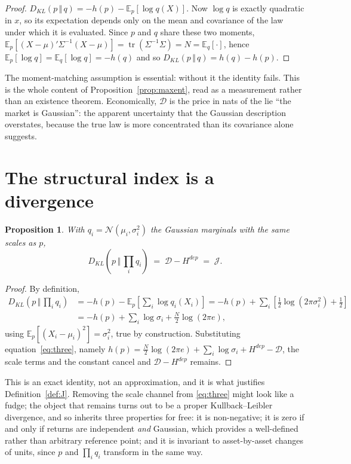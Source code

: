 \documentclass[11pt]{article}
\newtheorem{proposition}{Proposition}
\theoremstyle{definition}
\theoremstyle{remark}
\newcommand{\JJ}{\mathcal{J}}
\newcommand{\DD}{\mathcal{D}}
\newcommand{\KL}[2]{D_{KL}\!\left(#1\,\Vert\,#2\right)}
\begin{document}
\begin{proof}
$\KL{p}{q}=-h(p)-\mathbb{E}_p[\log q(X)]$. Now $\log q$ is exactly quadratic in
$x$, so its expectation depends only on the mean and covariance of the law under
which it is evaluated. Since $p$ and $q$ share these two moments,
$\mathbb{E}_p\!\left[(X-\mu)'\Sigma^{-1}(X-\mu)\right]=\operatorname{tr}(\Sigma^{-1}\Sigma)=N
=\mathbb{E}_q[\cdot]$, hence $\mathbb{E}_p[\log q]=\mathbb{E}_q[\log q]=-h(q)$ and
so $\KL{p}{q}=h(q)-h(p)$.
\end{proof}

The moment-matching assumption is essential: without it the identity fails. This
is the whole content of Proposition~\ref{prop:maxent}, read as a measurement
rather than an existence theorem. Economically, $\DD$ is the price in nats of the
lie ``the market is Gaussian'': the apparent uncertainty that the Gaussian
description overstates, because the true law is more concentrated than its
covariance alone suggests.

\section{The structural index is a divergence}
\label{app:index}

\begin{proposition}
\label{prop:index}
With $q_i=\mathcal N(\mu_i,\sigma_i^2)$ the Gaussian marginals with the same
scales as $p$,
\[
\KL{p}{\textstyle\prod_i q_i} \;=\; \DD - H^{dep} \;=\; \JJ .
\]
\end{proposition}

\begin{proof}
By definition,
\[
\begin{aligned}
\KL{p}{\textstyle\prod_i q_i} &= -h(p) - \mathbb{E}_p\!\left[\textstyle\sum_i\log q_i(X_i)\right]
= -h(p) + \sum_i\left[\tfrac12\log(2\pi\sigma_i^2)+\tfrac12\right]\\
&= -h(p) + \sum_i\log\sigma_i + \tfrac N2\log(2\pi e),
\end{aligned}
\]
using $\mathbb{E}_p[(X_i-\mu_i)^2]=\sigma_i^2$, true by construction. Substituting
equation~\eqref{eq:three}, namely
$h(p)=\tfrac N2\log(2\pi e)+\sum_i\log\sigma_i+H^{dep}-\DD$, the scale terms and
the constant cancel and $\DD-H^{dep}$ remains.
\end{proof}

This is an exact identity, not an approximation, and it is what justifies
Definition~\ref{def:J}. Removing the scale channel from \eqref{eq:three} might
look like a fudge; the object that remains turns out to be a proper
Kullback--Leibler divergence, and so inherits three properties for free: it is
non-negative; it is zero if and only if returns are independent \emph{and}
Gaussian, which provides a well-defined rather than arbitrary reference point;
and it is invariant to asset-by-asset changes of units, since $p$ and
$\prod_i q_i$ transform in the same way.
\end{document}
